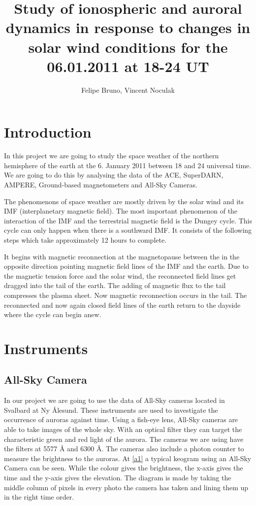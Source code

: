 \documentclass[10pt,a4paper]{article}
\author{Felipe Bruno, Vincent Noculak}
\title{Study of ionospheric and auroral dynamics in response to changes in solar wind conditions for the 06.01.2011 at 18-24 UT}
\begin{document}
\maketitle
\newpage
\tableofcontents
\newpage


\section{Introduction}

In this project we are going to study the space weather of the northern hemisphere of the earth at the 6. January 2011 between 18 and 24 universal time. We are going to do this by analysing the data of the ACE, SuperDARN, AMPERE, Ground-based magnetometers and All-Sky Cameras.

The phenomenons of space weather are mostly driven by the solar wind and its IMF (interplanetary magnetic field). The most important phenomenon of the interaction of the IMF and the terrestrial magnetic field is the Dungey cycle. This cycle can only happen when there is a southward IMF. It consists of the following steps which take approximately 12 hours to complete.

It begins with magnetic reconnection at the magnetopause between the in the opposite direction pointing magnetic field lines of the IMF and the earth. Due to the magnetic tension force and the solar wind, the reconnected field lines get dragged into the tail of the earth. The adding of magnetic flux to the tail compresses the plasma sheet. Now magnetic reconnection occurs in the tail. The reconnected and now again closed field lines of the earth return to the dayside where the cycle can begin anew.

\section{Instruments}

\subsection{All-Sky Camera}

In our project we are going to use the data of All-Sky cameras located in Svalbard at Ny Ålesund. These instruments are used to investigate the occurrence of auroras against time.
 Using a fish-eye lens, All-Sky cameras are able to take images of the whole sky. With an optical filter they can target the characteristic green and red light of the aurora. The cameras we are using have the filters at 5577 Å and 6300 Å. The cameras also include a photon counter to measure the brightness to the auroras. At \ref{a1} a typical keogram using an All-Sky Camera can be seen. While the colour gives the brightness, the x-axis gives the time and the y-axis gives the elevation. The diagram is made by taking the middle column of pixels in every photo the camera has taken and lining them up in the right time order.
\end{document}
